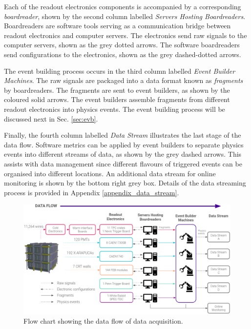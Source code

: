 Each of the readout electronics components is accompanied by a corresponding \textit{boardreader}, shown by the second column labelled \textit{Servers Hosting Boardreaders}.
Boardreaders are software tools serving as a communication bridge between readout electronics and computer servers.
The electronics send raw signals to the computer servers, shown as the grey dotted arrows.
The software boardreaders send configurations to the electronics, shown as the grey dashed-dotted arrows.

The event building process occurs in the third column labelled \textit{Event Builder Machines}.
The raw signals are packaged into a data format known as \textit{fragments} by boardreaders.
The fragments are sent to event builders, as shown by the coloured solid arrows.
The event builders assemble fragments from different readout electronics into physics events.
The event building process will be discussed next in Sec. \ref{sec:evb}.
                        
Finally, the fourth column labelled \textit{Data Stream} illustrates the last stage of the data flow.
Software metrics can be applied by event builders to separate physics events into different streams of data, as shown by the grey dashed arrows.
This assists with data management since different flavours of triggered events can be organised into different locations.
An additional data stream for online monitoring is shown by the bottom right grey box.
Details of the data streaming process is provided in Appendix \ref{appendix_data_stream}.

\begin{figure}[ht!] 
\centering    
\includegraphics[width=1.0\textwidth]{DAQ_Overview}
\caption[Data Acquision Flow Chart]{
Flow chart showing the data flow of data acquisition.
}
\label{fig:daqOverview}
\end{figure}

